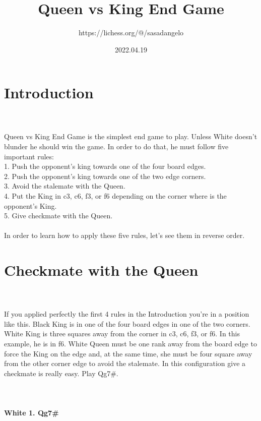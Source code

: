 \documentclass{article}
\title{Queen vs King End Game}
\author{https://lichess.org/@/sasadangelo}
\date{2022.04.19}
\begin{document}
\begin{titlepage}
\maketitle
\end{titlepage}
\section{ Introduction}

\\
\\
Queen vs King End Game is the simplest end game to play. Unless White doesn't blunder he should win the game. In order to do that, he must follow five important rules:\\1. Push the opponent's king towards one of the four board edges.\\2. Push the opponent's king towards one of the two edge corners.\\3. Avoid the stalemate with the Queen.\\4. Put the King in c3, c6, f3, or f6 depending on the corner where is the opponent's King.\\5. Give checkmate with the Queen.\\\\In order to learn how to apply these five rules, let's see them in reverse order.\section{ Checkmate with the Queen}

\\
\\
If you applied perfectly the first 4 rules in the Introduction you're in a position like this. Black King is in one of the four board edges in one of the two corners. White King is three squares away from the corner in c3, c6, f3, or f6. In this example, he is in f6. White Queen must be one rank away from the board edge to force the King on the edge and, at the same time, she must be four square away from the other corner edge to avoid the stalemate. In this configuration give a checkmate is really easy. Play Qg7\#.\\\\

\\
\\
\textbf{White 1. Qg7\#}\\
\end{document}
